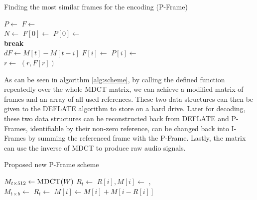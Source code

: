 \begin{algorithm}[ht]
\caption{Finding the most similar frames for the encoding (P-Frame)}
\label{alg:find-pframe}
\begin{algorithmic}
    \State $P \gets$ 
    \State $F \gets$ 
    \\
    \State $N \gets$ 
    \State $F[0] \gets$  
    \State $P[0] \gets$ 
    \\
            \State \textbf{break} 
        \EndIf
        \\
        \State $dF \gets M[t] - M[t - i]$
        \State $F[i] \gets$  
        \State $P[i] \gets$ 
    \EndFor
    \\
    \State $r \gets$  
    \State \Return $(r, F[r])$
\EndFunction
\end{algorithmic}
\end{algorithm}

As can be seen in algorithm \ref{alg:scheme}, by calling the defined function repeatedly over the whole MDCT matrix, we can achieve a modified matrix of frames and an array of all used references. These two data structures can then be given to the DEFLATE algorithm to store on a hard drive. Later for decoding, these two data structures can be reconstructed back from DEFLATE and P-Frames, identifiable by their non-zero reference, can be changed back into I-Frames by summing the referenced frame with the P-Frame. Lastly, the matrix can use the inverse of MDCT to produce raw audio signals.

\begin{algorithm}[ht]
\caption{Proposed new P-Frame scheme}\label{alg:scheme}
\begin{algorithmic}
    \State $M_{t \times 512} \gets \Call{MDCT}{W}$
    \State $R_t \gets$ 
        \State $R[i], M[i] \gets$ 
    \EndFor
    \State \Return {}, 
\EndFunction
\\
    \State $M_{t \times b} \gets$ 
    \State $R_{t} \gets$ 
            \State $M[i] \gets M[i] + M[i-R[i]]$
        \EndIf
    \EndFor
    \State \Return {}
\EndFunction
\end{algorithmic}
\end{algorithm}

